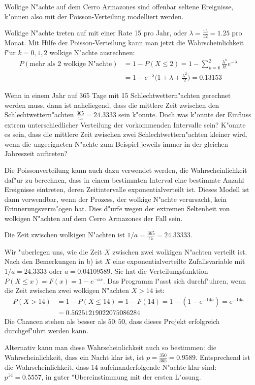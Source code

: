 \begin{loesung}
Wolkige N"achte auf dem Cerro Armazones sind offenbar seltene
Ereignisse, k"onnen also mit der Poisson-Verteilung modelliert
werden.
\begin{teilaufgaben}
\item Wolkige N"achte treten auf mit einer Rate 15 pro Jahr, oder
$\lambda=\frac{15}{12}=1.25$ pro Monat. Mit Hilfe der Poisson-Verteilung
kann man jetzt die Wahrscheinlichkeit f"ur $k=0,1,2$ wolkige N"achte
ausrechnen:
\begin{align*}
P(\text{mehr als 2 wolkige N"achte})
&=1-P(X\le 2)
=
1-\sum_{k=0}^2\frac{\lambda^k}{k!}e^{-\lambda}
\\
&=1-e^{-\lambda}\biggl(1+\lambda+\frac{\lambda^2}2\biggr)
=0.13153
\end{align*}
\item 
Wenn in einem Jahr auf 365 Tage mit 15 Schlechtwettern"achten gerechnet
werden muss, dann ist naheliegend, dass die  mittlere Zeit zwischen
den Schlechtwettern"achten $\frac{365}{15}=24.3333$ sein k"onnte.
Doch was k"onnte der Einfluss extrem unterschiedlicher Verteilung
der vorkommenden Intervalle sein? K"onnte es sein, dass die mittlere
Zeit zwischen zwei Schlechtwettern"achten kleiner wird, wenn die
ungeeigneten N"achte zum Beispiel jeweils immer in der gleichen Jahreszeit
auftreten?

Die Poissonverteilung kann auch dazu verwendet werden, die Wahrscheinlichkeit
daf"ur zu berechnen, dass in einem bestimmten Interval eine bestimmte
Anzahl Ereignisse eintreten, deren Zeitintervalle exponentialverteilt ist.
Dieses Modell ist dann verwendbar, wenn der Prozess, der wolkige N"achte
verursacht, kein Erinnerungsverm"ogen hat. Dies d"urfe wegen der extremen
Seltenheit von wolkigen N"achten auf dem Cerro Armazones der Fall sein.

Die Zeit zwischen wolkigen N"achten ist $1/a=\frac{365}{15}=24.33333$.
\item
Wir "uberlegen uns, wie
die Zeit $X$ zwischen zwei wolkigen N"achten verteilt ist. Nach den Bemerkungen
in b) ist $X$ eine exponentialverteilte Zufallsvariable mit $1/a=24.3333$
oder $a=0.04109589$.
Sie hat die Verteilungsfunktion
$
P(X\le x)=
F(x)=1-e^{-ax}.
$
Das Programm l"asst sich durchf"uhren, wenn die Zeit zwischen zwei
wolkigen N"achten $X> 14$ ist:
\begin{align*}
P(X> 14)&=1-P(X\le 14)=1-F(14)=1-(1-e^{-14a})=e^{-14a}
\\
&= 0.56251219022075086284
\end{align*}
Die Chancen stehen als besser als $50:50$, dass dieses Projekt
erfolgreich durchgef"uhrt werden kann.

Alternativ kann man diese Wahrscheinlichkeit auch so bestimmen:
die Wahrscheinlichkeit, dass ein Nacht klar ist, ist $p=\frac{350}{365}=0.9589$.
Entsprechend ist die Wahrscheinlichkeit, dass 14 aufeinanderfolgende
N"achte klar sind: $p^{14}=0.5557$, in guter "Ubereinstimmung mit der
ersten L"osung.
\end{teilaufgaben}
\end{loesung}

